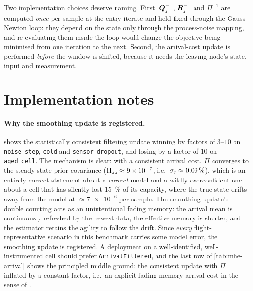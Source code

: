 Two implementation choices deserve naming.  First, $\bm{Q}_j^{-1}$, $\bm{R}_j^{-1}$ and $\Pi^{-1}$ are
computed \emph{once} per sample at the entry iterate and held fixed through the Gauss--Newton loop:
they depend on the state only through the process-noise mapping, and re-evaluating them inside the
loop would change the objective being minimised from one iteration to the next.  Second, the
arrival-cost update  is performed \emph{before} the window is
shifted, because it needs the leaving node's state, input and measurement.

\section{Implementation notes}
\label{sec:mhe-impl}
\paragraph{Why the smoothing update is registered.}   shows the statistically
consistent filtering update winning by factors of $3$--$10$ on \texttt{noise\_step}, \texttt{cold}
and \texttt{sensor\_dropout}, and losing by a factor of $10$ on \texttt{aged\_cell}.  The mechanism
is clear: with a consistent arrival cost, $\Pi$ converges to the steady-state prior covariance
($\Pi_{zz}\approx\num{9e-7}$, i.e.\ $\sigma_{z}\approx\SI{0.09}{\percent}$), which is an entirely
correct statement about a \emph{correct} model and a wildly overconfident one about a cell that has
silently lost \SI{15}{\percent} of its capacity, where the true state drifts away from the model at
$\approx\num{7e-6}$ per sample.  The smoothing update's double counting acts as an unintentional
fading memory: the arrival mean is continuously refreshed by the newest data, the effective memory
is shorter, and the estimator retains the agility to follow the drift.  Since \emph{every}
flight-representative scenario in this benchmark carries some model error, the smoothing update is
registered.  A deployment on a well-identified, well-instrumented cell should prefer
\texttt{ArrivalFiltered}, and the last row of \cref{tab:mhe-arrival} shows the principled middle
ground: the consistent update with $\Pi$ inflated by a constant factor, i.e.\ an explicit
fading-memory arrival cost in the sense of \citet{sorenson1971fading}.

